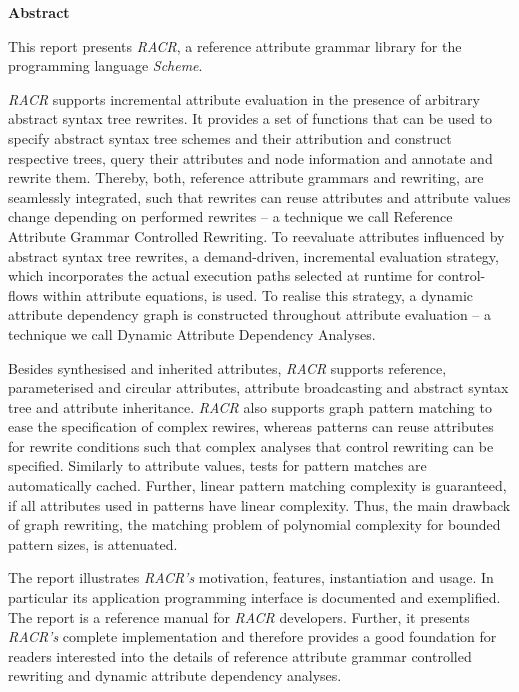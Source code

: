 

\cleardoublepage\thispagestyle{empty}
\begin{center}{\bfseries Abstract}\end{center}
\begin{onehalfspace}
This report presents \emph{RACR}, a reference attribute grammar library for the programming language \emph{Scheme}.

\vspace{7pt}

\emph{RACR} supports incremental attribute evaluation in the presence of arbitrary abstract syntax tree rewrites. It provides a set of functions that can be used to specify abstract syntax tree schemes and their attribution and construct respective trees, query their attributes and node information and annotate and rewrite them. Thereby, both, reference attribute grammars and rewriting, are seamlessly integrated, such that rewrites can reuse attributes and attribute values change depending on performed rewrites – a technique we call Reference Attribute Grammar Controlled Rewriting. To reevaluate attributes influenced by abstract syntax tree rewrites, a demand-driven, incremental evaluation strategy, which incorporates the actual execution paths selected at runtime for control-flows within attribute equations, is used. To realise this strategy, a dynamic attribute dependency graph is constructed throughout attribute evaluation – a technique we call Dynamic Attribute Dependency Analyses.

\vspace{7pt}

Besides synthesised and inherited attributes, \emph{RACR} supports reference, parameterised and circular attributes, attribute broadcasting and abstract syntax tree and attribute inheritance. \emph{RACR} also supports graph pattern matching to ease the specification of complex rewires, whereas patterns can reuse attributes for rewrite conditions such that complex analyses that control rewriting can be specified. Similarly to attribute values, tests for pattern matches are automatically cached. Further, linear pattern matching complexity is guaranteed, if all attributes used in patterns have linear complexity. Thus, the main drawback of graph rewriting, the matching problem of polynomial complexity for bounded pattern sizes, is attenuated.

\vspace{7pt}

The report illustrates \emph{RACR's} motivation, features, instantiation and usage. In particular its
application programming interface is documented and exemplified. The report is a reference manual for
\emph{RACR} developers. Further, it presents \emph{RACR’s} complete implementation and therefore provides a good
foundation for readers interested into the details of reference attribute grammar controlled rewriting
and dynamic attribute dependency analyses.
\end{onehalfspace}
\vfill\null